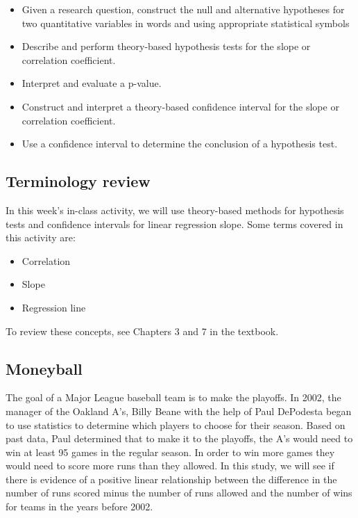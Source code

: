 \documentclass[
]{report}
\begin{document}
\begin{itemize}
\item
  Given a research question, construct the null and alternative hypotheses for two quantitative variables
  in words and using appropriate statistical symbols
\item
  Describe and perform theory-based hypothesis tests for the slope or correlation coefficient.
\item
  Interpret and evaluate a p-value.
\item
  Construct and interpret a theory-based confidence interval for the slope or correlation coefficient.
\item
  Use a confidence interval to determine the conclusion of a hypothesis test.
\end{itemize}

\hypertarget{terminology-review-11}{%
\subsection{Terminology review}\label{terminology-review-11}}

In this week's in-class activity, we will use theory-based methods for hypothesis tests and confidence intervals for linear regression slope. Some terms covered in this activity are:

\begin{itemize}
\item
  Correlation
\item
  Slope
\item
  Regression line
\end{itemize}

To review these concepts, see Chapters 3 and 7 in the textbook.

\hypertarget{moneyball}{%
\subsection{Moneyball}\label{moneyball}}

The goal of a Major League baseball team is to make the playoffs. In 2002, the manager of the Oakland A's, Billy Beane with the help of Paul DePodesta began to use statistics to determine which players to choose for their season. Based on past data, Paul determined that to make it to the playoffs, the A's would need to win at least 95 games in the regular season. In order to win more games they would need to score more runs than they allowed. In this study, we will see if there is evidence of a positive linear relationship between the difference in the number of runs scored minus the number of runs allowed and the number of wins for teams in the years before 2002.
\end{document}
